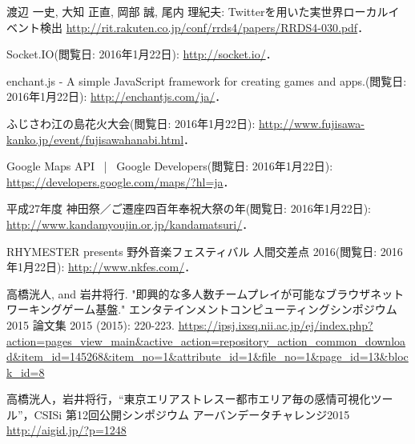 \begin{thebibliography}{99}
        渡辺 一史, 大知 正直, 岡部 誠, 尾内 理紀夫:
        Twitterを用いた実世界ローカルイベント検出
        \url{http://rit.rakuten.co.jp/conf/rrds4/papers/RRDS4-030.pdf}．

        Socket.IO(閲覧日: 2016年1月22日):
        \url{http://socket.io/}．

        enchant.js - A simple JavaScript framework for creating games and apps.(閲覧日: 2016年1月22日):
        \url{http://enchantjs.com/ja/}．

        ふじさわ江の島花火大会(閲覧日: 2016年1月22日):
        \url{http://www.fujisawa-kanko.jp/event/fujisawahanabi.html}．

        Google Maps API  |  Google Developers(閲覧日: 2016年1月22日):
        \url{https://developers.google.com/maps/?hl=ja}．

        平成27年度 神田祭／ご遷座四百年奉祝大祭の年(閲覧日: 2016年1月22日):
        \url{http://www.kandamyoujin.or.jp/kandamatsuri/}．

        RHYMESTER presents 野外音楽フェスティバル 人間交差点 2016(閲覧日: 2016年1月22日):
        \url{http://www.nkfes.com/}．

        高橋洸人, and 岩井将行. "即興的な多人数チームプレイが可能なブラウザネットワーキングゲーム基盤." エンタテインメントコンピューティングシンポジウム 2015 論文集 2015 (2015): 220-223.
        \url{https://ipsj.ixsq.nii.ac.jp/ej/index.php?action=pages_view_main&active_action=repository_action_common_download&item_id=145268&item_no=1&attribute_id=1&file_no=1&page_id=13&block_id=8}

        高橋洸人，岩井将行，“東京エリアストレスー都市エリア毎の感情可視化ツール”，CSISi 第12回公開シンポジウム アーバンデータチャレンジ2015
        \url{http://aigid.jp/?p=1248}

\end{thebibliography}

